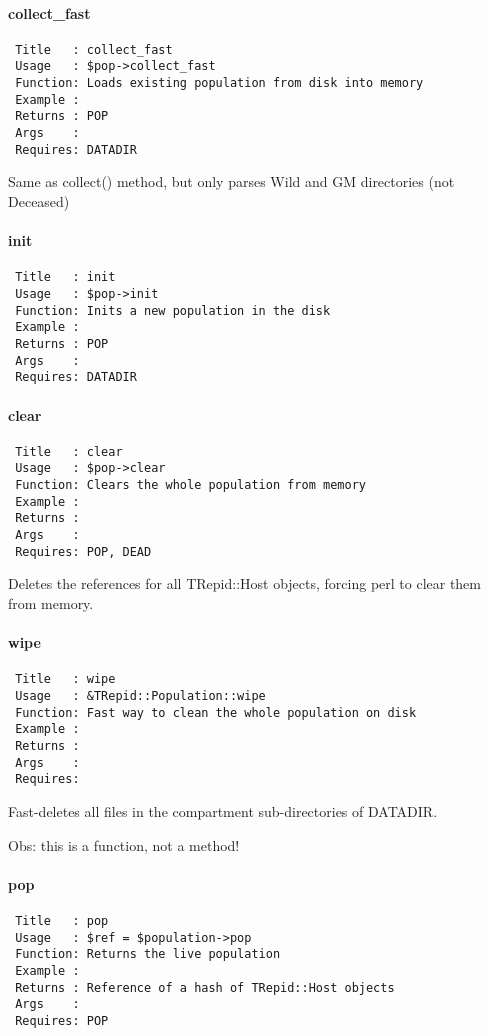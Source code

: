 \paragraph*{collect\_fast\label{collect_fast}}
\begin{verbatim}
 Title   : collect_fast
 Usage   : $pop->collect_fast
 Function: Loads existing population from disk into memory
 Example :
 Returns : POP
 Args    : 
 Requires: DATADIR
\end{verbatim}


Same as collect() method, but only parses Wild and GM directories (not
Deceased)

\paragraph*{init\label{init}}
\begin{verbatim}
 Title   : init
 Usage   : $pop->init
 Function: Inits a new population in the disk
 Example :
 Returns : POP
 Args    : 
 Requires: DATADIR
\end{verbatim}
\paragraph*{clear\label{clear}}
\begin{verbatim}
 Title   : clear
 Usage   : $pop->clear
 Function: Clears the whole population from memory
 Example :
 Returns :
 Args    : 
 Requires: POP, DEAD
\end{verbatim}


Deletes the references for all TRepid::Host objects, forcing perl to
clear them from memory.

\paragraph*{wipe\label{wipe}}
\begin{verbatim}
 Title   : wipe
 Usage   : &TRepid::Population::wipe
 Function: Fast way to clean the whole population on disk
 Example :
 Returns :
 Args    : 
 Requires:
\end{verbatim}


Fast-deletes all files in the compartment sub-directories of DATADIR.



Obs: this is a function, not a method!

\paragraph*{pop\label{pop}}
\begin{verbatim}
 Title   : pop
 Usage   : $ref = $population->pop
 Function: Returns the live population 
 Example :
 Returns : Reference of a hash of TRepid::Host objects
 Args    :
 Requires: POP
\end{verbatim}


